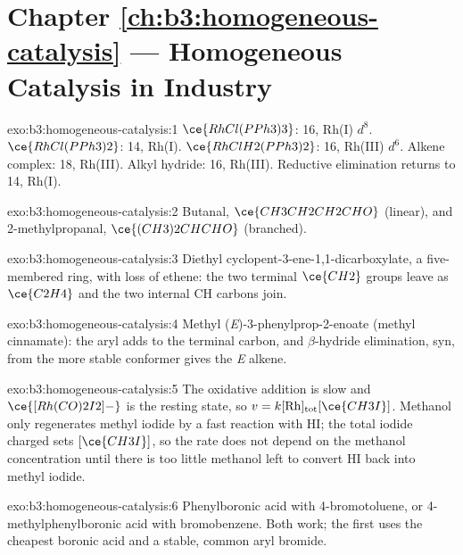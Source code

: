 \section*{Chapter \ref{ch:b3:homogeneous-catalysis} --- Homogeneous Catalysis in Industry}

\begin{solution}{exo:b3:homogeneous-catalysis:1}
$\ce{RhCl(PPh3)3}$: 16, Rh(I) $d^8$. $\ce{RhCl(PPh3)2}$: 14, Rh(I). $\ce{RhClH2(PPh3)2}$: 16, Rh(III) $d^6$.
Alkene complex: 18, Rh(III). Alkyl hydride: 16, Rh(III). Reductive elimination
returns to 14, Rh(I).
\end{solution}

\begin{solution}{exo:b3:homogeneous-catalysis:2}
Butanal, $\ce{CH3CH2CH2CHO}$ (linear), and 2-methylpropanal, $\ce{(CH3)2CHCHO}$ (branched).
\end{solution}

\begin{solution}{exo:b3:homogeneous-catalysis:3}
Diethyl cyclopent-3-ene-1,1-dicarboxylate, a five-membered ring, with loss of
ethene: the two terminal $\ce{CH2}$ groups leave as $\ce{C2H4}$ and the two internal CH carbons
join.
\end{solution}

\begin{solution}{exo:b3:homogeneous-catalysis:4}
Methyl (\textit{E})-3-phenylprop-2-enoate (methyl cinnamate): the aryl adds to the
terminal carbon, and $\beta$-hydride elimination, syn, from the more stable conformer
gives the \textit{E} alkene.
\end{solution}

\begin{solution}{exo:b3:homogeneous-catalysis:5}
The oxidative addition is slow and $\ce{[Rh(CO)2I2]-}$ is the resting state, so
$v = k[\mathrm{Rh}]_{\mathrm{tot}}[\ce{CH3I}]$. Methanol only regenerates methyl iodide by a fast reaction with HI;
the total iodide charged sets $[\ce{CH3I}]$, so the rate does not depend on the methanol
concentration until there is too little methanol left to convert HI back into
methyl iodide.
\end{solution}

\begin{solution}{exo:b3:homogeneous-catalysis:6}
Phenylboronic acid with 4-bromotoluene, or 4-methylphenylboronic acid with
bromobenzene. Both work; the first uses the cheapest boronic acid and a stable,
common aryl bromide.
\end{solution}

